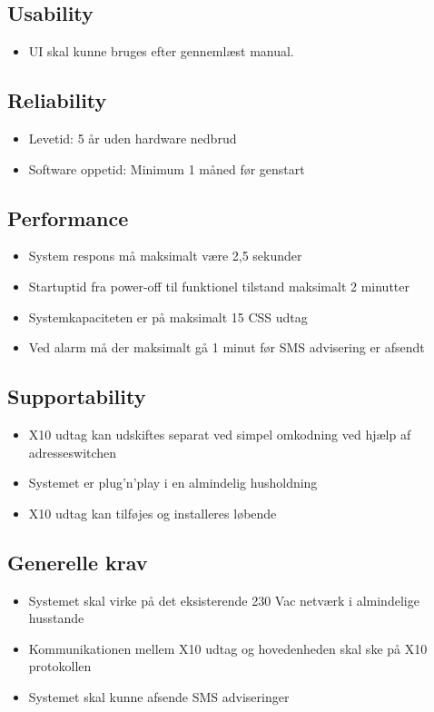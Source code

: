 \subsection*{Usability}
\begin{itemize}
\item UI skal kunne bruges efter gennemlæst manual.
\end{itemize}

\subsection*{Reliability}
\begin{itemize}
\item Levetid: 5 år uden hardware nedbrud
\item Software oppetid: Minimum 1 måned før genstart
\end{itemize}

\subsection*{Performance}
\begin{itemize}
\item System respons må maksimalt være 2,5 sekunder
\item Startuptid fra power-off til funktionel tilstand maksimalt 2 minutter
\item Systemkapaciteten er på maksimalt 15 CSS udtag
\item Ved alarm må der maksimalt gå 1 minut før SMS advisering er afsendt
\end{itemize}

\subsection*{Supportability}
\begin{itemize}
\item X10 udtag kan udskiftes separat ved simpel omkodning ved hjælp af adresseswitchen 
\item Systemet er plug’n’play i en almindelig husholdning
\item X10 udtag kan tilføjes og installeres løbende
\end{itemize}

\subsection*{Generelle krav}
\begin{itemize}
\item Systemet skal virke på det eksisterende 230 Vac netværk i almindelige husstande
\item Kommunikationen mellem X10 udtag og hovedenheden skal ske på X10 protokollen
\item Systemet skal kunne afsende SMS adviseringer
\end{itemize}

